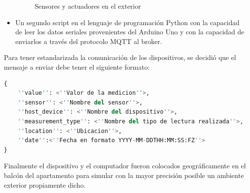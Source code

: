 \begin{itemize}
\begin{figure}[!htb]
\caption{Sensores y actuadores en el exterior}
\label{fig:sensores_ext}
\vspace*{-10pt}
\end{figure}

\item Un segundo script en el lenguaje de programación Python con la capacidad de leer los datos seriales provenientes del Arduino Uno y con la capacidad de enviarlos a través del protocolo MQTT al broker. %
\end{itemize}

Para tener estandarizada la comunicación de los dispositivos, se decidió que el mensaje a enviar debe tener el siguiente formato:\\ 
\begin{lstlisting}[language=Python]
{
    ''value'': <''Valor de la medicion''>,
    ''sensor'': <''Nombre del sensor''>,
    ''host_device'': <''Nombre del dispositivo''>,
    ''measurement_type'': <''Nombre del tipo de lectura realizada''>,
    ''location'': <''Ubicacion''>,
    ''date'':<''Fecha en formato YYYY-MM-DDTHH:MM:SS:FZ''>
}
\end{lstlisting}

Finalmente el dispositivo y el computador fueron colocados geográficamente en el balcón del apartamento para simular con la mayor precisión posible un ambiente exterior propiamente dicho.\\


